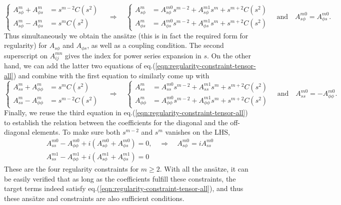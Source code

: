 \[
\left\{\begin{aligned}
    A_{s\phi}^m + A_{\phi s}^m &= s^{m-2} C(s^2) \\ 
    A_{s\phi}^m - A_{\phi s}^m &= s^m C(s^2)
\end{aligned}\right. \quad \Longrightarrow\quad 
\left\{\begin{aligned}
    A_{s\phi}^m &= A_{s\phi}^{m0} s^{m-2} + A_{s\phi}^{m1} s^{m} + s^{m+2} C(s^2) \\ 
    A_{\phi s}^m &= A_{\phi s}^{m0} s^{m-2} + A_{\phi s}^{m1} s^{m} + s^{m+2} C(s^2) 
\end{aligned}\right. \quad \mathrm{and} \quad A_{s\phi}^{m0} = A_{\phi s}^{m0}.
\]
Thus simultaneously we obtain the ansätze (this is in fact the required form for regularity) for $A_{s\phi}$ and $A_{\phi s}$, as well as a coupling condition. The second superscript on $A_{ij}^{mn}$ gives the index for power series expansion in $s$. On the other hand, we can add the latter two equations of eq.(\ref{eqn:regularity-constraint-tensor-all}) and combine with the first equation to similarly come up with 
\[
\left\{\begin{aligned}
    A_{ss}^m + A_{\phi \phi}^m &= s^{m} C(s^2) \\ 
    A_{ss}^m - A_{\phi \phi}^m &= s^{m-2} C(s^2)
\end{aligned}\right. \quad \Longrightarrow\quad 
\left\{\begin{aligned}
    A_{ss}^m &= A_{ss}^{m0} s^{m-2} + A_{ss}^{m1} s^{m} + s^{m+2} C(s^2) \\ 
    A_{\phi \phi}^m &= A_{\phi\phi}^{m0} s^{m-2} + A_{\phi\phi}^{m1} s^{m} + s^{m+2} C(s^2) 
\end{aligned}\right. \quad \mathrm{and} \quad A_{ss}^{m0} = - A_{\phi\phi}^{m0}.
\]
Finally, we reuse the third equation in eq.(\ref{eqn:regularity-constraint-tensor-all}) to establish the relation between the coefficients for the diagonal and the off-diagonal elements. To make sure both $s^{m-2}$ and $s^m$ vanishes on the LHS,
\[
\begin{aligned}
    A_{ss}^{m0} - A_{\phi\phi}^{m0} + i \left(A_{s\phi}^{m0} + A_{\phi s}^{m0}\right) = 0, \quad \Longrightarrow\quad A_{s\phi}^{m0} = i A_{ss}^{m0} \\
    A_{ss}^{m1} - A_{\phi\phi}^{m1} + i \left(A_{s\phi}^{m1} + A_{\phi s}^{m1}\right) = 0
\end{aligned}
\]
These are the four regularity constraints for $m\geq 2$. With all the ansätze, it can be easily verified that as long as the coefficients fulfill these constraints, the target terms indeed satisfy eq.(\ref{eqn:regularity-constraint-tensor-all}), and thus these ansätze and constraints are also sufficient conditions.

